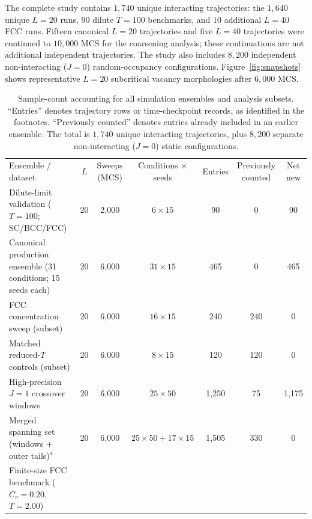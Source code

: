 \documentclass[aps,pre,reprint,superscriptaddress,amsmath,amssymb,floatfix]{revtex4-2}
\begin{document}
The complete study contains $1{,}740$ unique interacting trajectories: the $1{,}640$ unique $L=20$ runs, $90$ dilute $T=100$ benchmarks, and $10$ additional $L=40$ FCC runs. Fifteen canonical $L=20$ trajectories and five $L=40$ trajectories were continued to $10{,}000$ MCS for the coarsening analysis; these continuations are not additional independent trajectories. The study also includes $8{,}200$ independent non-interacting ($J=0$) random-occupancy configurations. Figure~\ref{fig:snapshots} shows representative $L=20$ subcritical vacancy morphologies after $6{,}000$ MCS.

\begin{table}[t]
\caption{\label{tab:sample_accounting}Sample-count accounting for all simulation ensembles and analysis subsets. ``Entries'' denotes trajectory rows or time-checkpoint records, as identified in the footnotes. ``Previously counted'' denotes entries already included in an earlier ensemble. The total is $1{,}740$ unique interacting trajectories, plus $8{,}200$ separate non-interacting ($J=0$) static configurations.}
\begingroup
\scriptsize
\setlength{\tabcolsep}{2pt}
\renewcommand{\arraystretch}{1.12}
\begin{ruledtabular}
\begin{tabular*}{\textwidth}{@{\extracolsep{\fill}}lcccccc}
Ensemble / dataset
& $L$
& \shortstack{Sweeps\\(MCS)}
& \shortstack{Conditions\\$\times$ seeds}
& Entries
& \shortstack{Previously\\counted}
& \shortstack{Net\\new} \\
\colrule
Dilute-limit validation ($T=100$; SC/BCC/FCC)
& 20 & 2{,}000 & $6 \times 15$ & 90 & 0 & 90 \\
Canonical production ensemble (31 conditions; 15 seeds each)
& 20 & 6{,}000 & $31 \times 15$ & 465 & 0 & 465 \\
\quad FCC concentration sweep (subset)
& 20 & 6{,}000 & $16 \times 15$ & 240 & 240 & 0 \\
\quad Matched reduced-$T$ controls (subset)
& 20 & 6{,}000 & $8 \times 15$ & 120 & 120 & 0 \\
High-precision $J=1$ crossover windows
& 20 & 6{,}000 & $25 \times 50$ & 1{,}250 & 75 & 1{,}175 \\
Merged spanning set (windows + outer tails)$^{a}$
& 20 & 6{,}000 & $25 \times 50 + 17 \times 15$ & 1{,}505 & 330 & 0 \\
Finite-size FCC benchmark ($C_v=0.20$, $T=2.00$)

\end{tabular*}
\end{ruledtabular}
\end{table}
\end{document}
